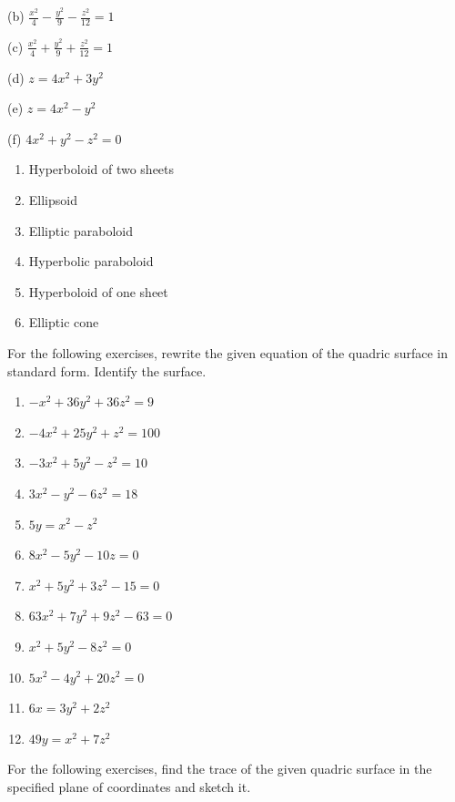 \documentclass{exercises}
\begin{document}
(b) $\frac{x^{2}}{4}-\frac{y^{2}}{9}-\frac{z^{2}}{12}=1$


(c) $\frac{x^{2}}{4}+\frac{y^{2}}{9}+\frac{z^{2}}{12}=1$


(d) $z=4x^{2}+3y^{2}$


(e) $z=4x^{2}-y^{2}$


(f) $4x^{2}+y^{2}-z^{2}=0$

\begin{enumerate}[resume]
\item Hyperboloid of two sheets
\item Ellipsoid
\item Elliptic paraboloid
\item Hyperbolic paraboloid
\item Hyperboloid of one sheet
\item Elliptic cone
\end{enumerate}

For the following exercises, rewrite the given equation of the quadric surface in standard form. Identify the surface.

\begin{enumerate}[resume]
\item $-x^{2}+36y^{2}+36z^{2}=9$
\item $-4x^{2}+25y^{2}+z^{2}=100$
\item $-3x^{2}+5y^{2}-z^{2}=10$
\item $3x^{2}-y^{2}-6z^{2}=18$
\item $5y=x^{2}-z^{2}$
\item $8x^{2}-5y^{2}-10z=0$
\item $x^{2}+5y^{2}+3z^{2}-15=0$
\item $63x^{2}+7y^{2}+9z^{2}-63=0$
\item $x^{2}+5y^{2}-8z^{2}=0$
\item $5x^{2}-4y^{2}+20z^{2}=0$
\item $6x=3y^{2}+2z^{2}$
\item $49y=x^{2}+7z^{2}$
\end{enumerate}

For the following exercises, find the trace of the given quadric surface in the specified plane of coordinates and sketch it.
\end{document}
